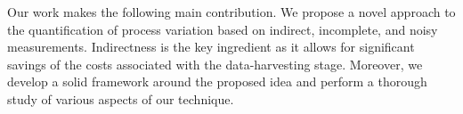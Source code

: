 Our work makes the following main contribution.
We propose a novel approach to the quantification of process variation based on indirect, incomplete, and noisy measurements.
Indirectness is the key ingredient as it allows for significant savings of the costs associated with the data-harvesting stage.
Moreover, we develop a solid framework around the proposed idea and perform a thorough study of various aspects of our technique.
